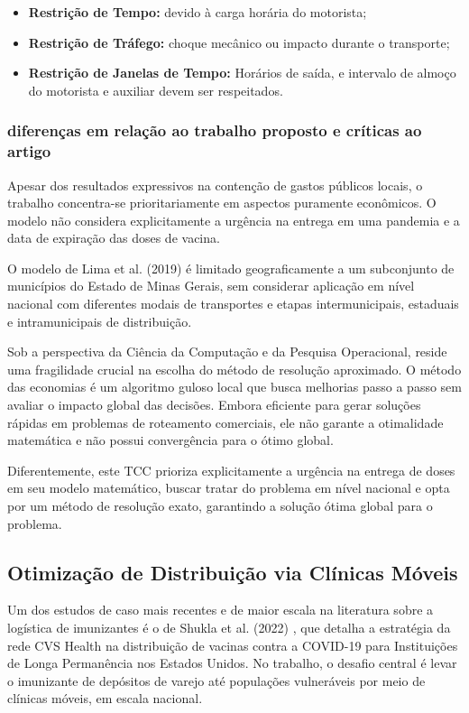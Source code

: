 \begin{itemize}
    \item \textbf{Restrição de Tempo:} devido à carga horária do motorista; 
    \item \textbf{Restrição de Tráfego:} choque mecânico ou impacto durante o transporte; 
    \item \textbf{Restrição de Janelas de Tempo:} Horários de saída, e intervalo de almoço do motorista e auxiliar devem ser respeitados.
\end{itemize}


\subsubsection{diferenças em relação ao trabalho proposto e críticas ao artigo}

Apesar dos resultados expressivos na contenção de gastos públicos locais, o trabalho concentra-se prioritariamente em aspectos puramente econômicos. O modelo não considera explicitamente a urgência na entrega em uma pandemia e a data de expiração das doses de vacina.

O  modelo de Lima et al. (2019) é limitado geograficamente a um subconjunto de municípios do Estado de Minas Gerais, sem considerar aplicação em nível nacional com diferentes modais de transportes e etapas intermunicipais, estaduais e intramunicipais de distribuição.

Sob a perspectiva da Ciência da Computação e da Pesquisa Operacional, reside uma fragilidade crucial na escolha do método de resolução aproximado. O método das economias é um algoritmo guloso local que busca melhorias passo a passo sem avaliar o impacto global das decisões. Embora eficiente para gerar soluções rápidas em problemas de roteamento comerciais, ele não garante a otimalidade matemática e não possui convergência para o ótimo global.

Diferentemente, este TCC prioriza explicitamente a urgência na entrega de doses em seu modelo matemático, buscar tratar do problema em nível nacional e opta por um método de resolução exato, garantindo a solução ótima global para o problema.

\subsection{Otimização de Distribuição via Clínicas Móveis}

Um dos estudos de caso mais recentes e de maior escala na literatura sobre a logística de imunizantes é o de Shukla et al. (2022) \cite{shukla2022optimizing}, que detalha a estratégia da rede CVS Health na distribuição de vacinas contra a COVID-19 para Instituições de Longa Permanência nos Estados Unidos. No trabalho, o desafio central é levar o imunizante de depósitos de varejo até populações vulneráveis por meio de clínicas móveis, em escala nacional.

